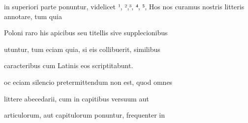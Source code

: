 





in superiori parte ponuntur, videlicet \colorbox{olive}{}¹, \colorbox{olive}{}²,\colorbox{olive}{}³, \colorbox{olive}{}⁴, \colorbox{olive}{}⁵,  Hos
nos curamus nostris litteris annotare, tum quia

Poloni raro his apicibus seu titellis sive supplecionibus

utuntur, tum eciam quia, si eis collibuerit, similibus

caracteribus cum Latinis eos scriptitabunt.

\indentP {}oc eciam silencio pretermittendum non est, quod omnes

littere abecedarii, cum in capitibus versuum aut

articulorum, aut capitulorum ponuntur, frequenter in

